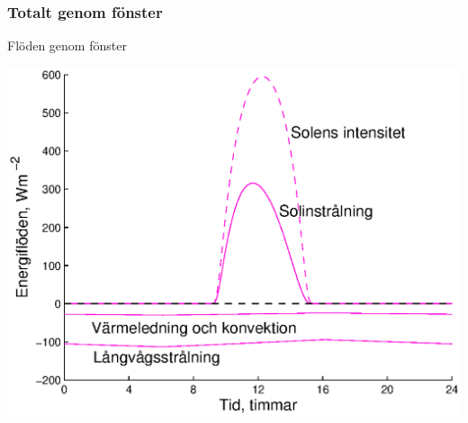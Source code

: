 
\subsubsection{Totalt genom fönster}
\begin{frame}{Flöden genom fönster}
\begin{center}
\includegraphics[scale=0.5]{images/windows_flow.eps}
\end{center}
\end{frame}
